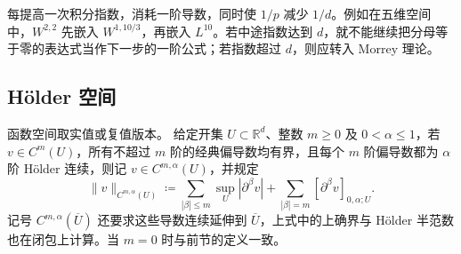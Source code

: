 每提高一次积分指数，消耗一阶导数，同时使 \(1/p\) 减少 \(1/d\)。例如在五维空间中，\(W^{2,2}\) 先嵌入 \(W^{1,10/3}\)，再嵌入 \(L^{10}\)。若中途指数达到 \(d\)，就不能继续把分母等于零的表达式当作下一步的一阶公式；若指数超过 \(d\)，则应转入 Morrey 理论。

\subsection{Hölder 空间}
\label{b1:subsec:240402}

\begin{definition}\label{b1:def:higher-holder-space}
函数空间取实值或复值版本。
给定开集 \(U\subset\mathbb R^d\)、整数 \(m\ge0\) 及 \(0<\alpha\le1\)，若 \(v\in C^m(U)\)，所有不超过 \(m\) 阶的经典偏导数均有界，且每个 \(m\) 阶偏导数都为 \(\alpha\) 阶 Hölder 连续，则记 \(v\in C^{m,\alpha}(U)\)，并规定
\[
 \|v\|_{C^{m,\alpha}(U)}
 \coloneqq\sum_{|\beta|\le m}\sup_U|\partial^\beta v|
   +\sum_{|\beta|=m}[\partial^\beta v]_{0,\alpha;U}.
\]
记号 \(C^{m,\alpha}(\overline U)\) 还要求这些导数连续延伸到 \(\overline U\)，上式中的上确界与 Hölder 半范数也在闭包上计算。当 \(m=0\) 时与前节的定义一致。
\end{definition}

